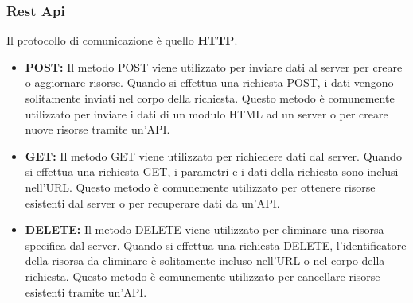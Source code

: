 \documentclass{article}
\begin{document}
		\subsubsection{Rest Api}
		Il protocollo di comunicazione è quello \textbf{HTTP}.
		\begin{itemize}
			\item \textbf{POST:} Il metodo POST viene utilizzato per inviare dati al server per creare o aggiornare risorse. Quando si effettua una richiesta POST, i dati vengono solitamente inviati nel corpo della richiesta. Questo metodo è comunemente utilizzato per inviare i dati di un modulo HTML ad un server o per creare nuove risorse tramite un'API.
			\item \textbf{GET:} Il metodo GET viene utilizzato per richiedere dati dal server. Quando si effettua una richiesta GET, i parametri e i dati della richiesta sono inclusi nell'URL. Questo metodo è comunemente utilizzato per ottenere risorse esistenti dal server o per recuperare dati da un'API.
			\item \textbf{DELETE:} Il metodo DELETE viene utilizzato per eliminare una risorsa specifica dal server. Quando si effettua una richiesta DELETE, l'identificatore della risorsa da eliminare è solitamente incluso nell'URL o nel corpo della richiesta. Questo metodo è comunemente utilizzato per cancellare risorse esistenti tramite un'API.
		\end{itemize}
		
\end{document}
